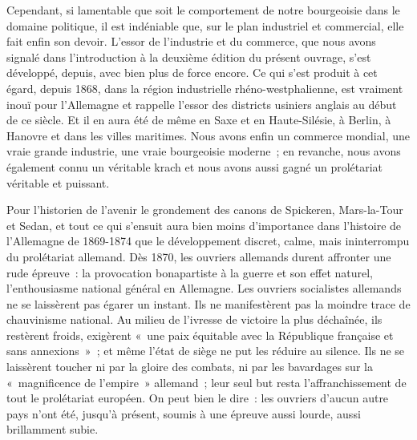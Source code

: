 \documentclass[french,twoside]{book} %
\begin{document}
Cependant, si lamentable que soit le comportement de notre bourgeoisie dans le domaine politique, il est indéniable que, sur le plan industriel et commercial, elle fait enfin son devoir. L’essor de l’industrie et du commerce, que nous avons signalé dans l’introduction à la deuxième édition du présent ouvrage, s’est développé, depuis, avec bien plus de force encore. Ce qui s’est produit à cet égard, depuis 1868, dans la région industrielle rhéno-westphalienne, est vraiment inouï pour l’Allemagne et rappelle l’essor des districts usiniers anglais au début de ce siècle. Et il en aura été de même en Saxe et en Haute-Silésie, à Berlin, à Hanovre et dans les villes maritimes. Nous avons enfin un commerce mondial, une vraie grande industrie, une vraie bourgeoisie moderne ; en revanche, nous avons également connu un véritable krach et nous avons aussi gagné un prolétariat véritable et puissant.\par
Pour l’historien de l’avenir le grondement des canons de Spickeren, Mars-la-Tour et Sedan, et tout ce qui s’ensuit aura bien moins d’importance dans l’histoire de l’Allemagne de 1869-1874 que le développement discret, calme, mais ininterrompu du prolétariat allemand. Dès 1870, les ouvriers allemands durent affronter une rude épreuve : la provocation bonapartiste à la guerre et son effet naturel, l’enthousiasme national général en Allemagne. Les ouvriers socialistes allemands ne se laissèrent pas égarer un instant. Ils ne manifestèrent pas la moindre trace de chauvinisme national. Au milieu de l’ivresse de victoire la plus déchaînée, ils restèrent froids, exigèrent « une paix équitable avec la République française et sans annexions » ; et même l’état de siège ne put les réduire au silence. Ils ne se laissèrent toucher ni par la gloire des combats, ni par les bavardages sur la « magnificence de l’empire » allemand ; leur seul but resta l’affranchissement de tout le prolétariat européen. On peut bien le dire : les ouvriers d’aucun autre pays n’ont été, jusqu’à présent, soumis à une épreuve aussi lourde, aussi brillamment subie.\par
\end{document}
